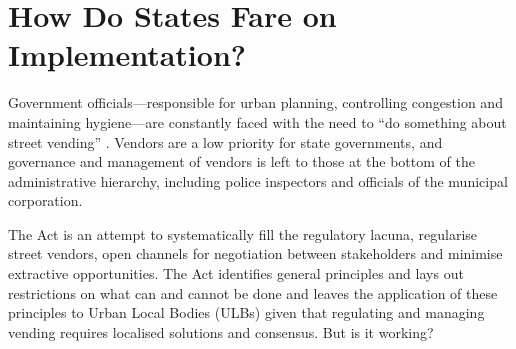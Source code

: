 \documentclass[a4paper, 12pt, twoside]{article}
\begin{document}
\section*{How Do States Fare on Implementation?}
	Government officials—responsible for urban planning, controlling congestion and maintaining hygiene—are constantly faced with the need to “do something about street vending” \parencite{bromleypaper}. Vendors are a low priority for state governments, and governance and management of vendors is left to those at the bottom of the administrative hierarchy, including police inspectors and officials of the municipal corporation.


	The Act is an attempt to systematically fill the regulatory lacuna, regularise street vendors, open channels for negotiation between stakeholders and minimise extractive opportunities. The Act identifies general principles and lays out restrictions on what can and cannot be done and leaves the application of these principles to Urban Local Bodies (ULBs) given that regulating and managing vending requires localised solutions and consensus. But is it working?
\end{document}
